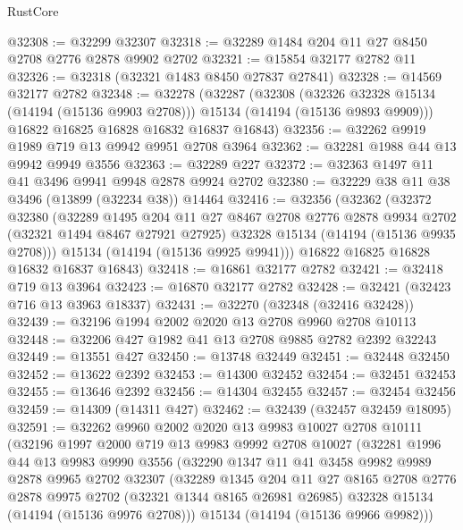 \begin{lexlean}{RustCore}
\begin{coremodule}
@32308 := @32299 @32307
@32318 := @32289 @1484 @204 @11 @27 @8450 @2708 @2776 @2878 @9902 @2702
@32321 := @15854 @32177 @2782 @11
@32326 := @32318 (@32321 @1483 @8450 @27837 @27841)
@32328 := @14569 @32177 @2782
@32348 := @32278
    (@32287
      (@32308
        (@32326 @32328 @15134 (@14194 (@15136 @9903 @2708)))
        @15134
        (@14194 (@15136 @9893 @9909)))
      @16822
      @16825
      @16828
      @16832
      @16837
      @16843)
@32356 := @32262 @9919 @1989 @719 @13 @9942 @9951 @2708 @3964
@32362 := @32281 @1988 @44 @13 @9942 @9949 @3556
@32363 := @32289 @227
@32372 := @32363 @1497 @11 @41 @3496 @9941 @9948 @2878 @9924 @2702
@32380 := @32229 @38 @11 @38 @3496 (@13899 (@32234 @38)) @14464
@32416 := @32356
    (@32362
      (@32372
        @32380
        (@32289
          @1495
          @204
          @11
          @27
          @8467
          @2708
          @2776
          @2878
          @9934
          @2702
          (@32321 @1494 @8467 @27921 @27925)
          @32328
          @15134
          (@14194 (@15136 @9935 @2708)))
        @15134
        (@14194 (@15136 @9925 @9941)))
      @16822
      @16825
      @16828
      @16832
      @16837
      @16843)
@32418 := @16861 @32177 @2782
@32421 := @32418 @719 @13 @3964
@32423 := @16870 @32177 @2782
@32428 := @32421 (@32423 @716 @13 @3963 @18337)
@32431 := @32270 (@32348 (@32416 @32428))
@32439 := @32196 @1994 @2002 @2020 @13 @2708 @9960 @2708 @10113
@32448 := @32206 @427 @1982 @41 @13 @2708 @9885 @2782 @2392 @32243
@32449 := @13551 @427
@32450 := @13748 @32449
@32451 := @32448 @32450
@32452 := @13622 @2392
@32453 := @14300 @32452
@32454 := @32451 @32453
@32455 := @13646 @2392
@32456 := @14304 @32455
@32457 := @32454 @32456
@32459 := @14309 (@14311 @427)
@32462 := @32439 (@32457 @32459 @18095)
@32591 := @32262
    @9960
    @2002
    @2020
    @13
    @9983
    @10027
    @2708
    @10111
    (@32196
      @1997
      @2000
      @719
      @13
      @9983
      @9992
      @2708
      @10027
      (@32281
        @1996
        @44
        @13
        @9983
        @9990
        @3556
        (@32290
          @1347
          @11
          @41
          @3458
          @9982
          @9989
          @2878
          @9965
          @2702
          @32307
          (@32289
            @1345
            @204
            @11
            @27
            @8165
            @2708
            @2776
            @2878
            @9975
            @2702
            (@32321 @1344 @8165 @26981 @26985)
            @32328
            @15134
            (@14194 (@15136 @9976 @2708)))
          @15134
          (@14194 (@15136 @9966 @9982)))

\end{coremodule}
\end{lexlean}

